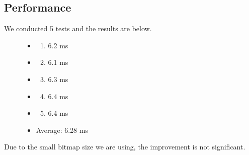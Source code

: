\documentclass[letterpaper,10pt,openany,oneside]{sphinxmanual}
\begin{document}
\subsection{Performance}
\label{RTACM/RTACM:id2}\begin{description}
\item[{We conducted 5 tests and the results are below.}] \leavevmode\begin{itemize}
\item {} \begin{enumerate}
\item {} 
6.2 ms

\end{enumerate}

\item {} \begin{enumerate}
\setcounter{enumi}{1}
\item {} 
6.1 ms

\end{enumerate}

\item {} \begin{enumerate}
\setcounter{enumi}{2}
\item {} 
6.3 ms

\end{enumerate}

\item {} \begin{enumerate}
\setcounter{enumi}{3}
\item {} 
6.4 ms

\end{enumerate}

\item {} \begin{enumerate}
\setcounter{enumi}{4}
\item {} 
6.4 ms

\end{enumerate}

\item {} 
Average: 6.28 ms

\end{itemize}

\end{description}

Due to the small bitmap size we are using, the improvement is not significant.



\renewcommand{\indexname}{Index}
\printindex
\end{document}
